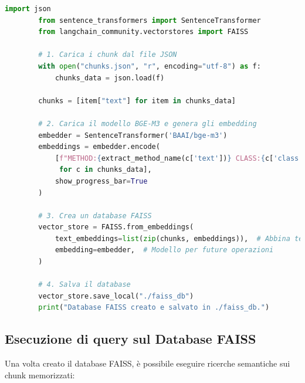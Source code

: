 \documentclass[12pt,a4paper,openright,twoside]{book}
\begin{document}
    \begin{lstlisting}[language=Python, caption={Codice Python per la generazione degli embedding e la creazione di un database FAISS}, label={lst:embeddings}]
        import json
        from sentence_transformers import SentenceTransformer
        from langchain_community.vectorstores import FAISS
        
        # 1. Carica i chunk dal file JSON
        with open("chunks.json", "r", encoding="utf-8") as f:
            chunks_data = json.load(f)
        
        chunks = [item["text"] for item in chunks_data]
        
        # 2. Carica il modello BGE-M3 e genera gli embedding
        embedder = SentenceTransformer('BAAI/bge-m3')
        embeddings = embedder.encode(
            [f"METHOD:{extract_method_name(c['text'])} CLASS:{c['class']} LINES:{c['start_line']}-{c['end_line']} CONTENT:{c['text']}" 
             for c in chunks_data],
            show_progress_bar=True
        )
        
        # 3. Crea un database FAISS
        vector_store = FAISS.from_embeddings(
            text_embeddings=list(zip(chunks, embeddings)),  # Abbina testi e embedding
            embedding=embedder,  # Modello per future operazioni
        )
        
        # 4. Salva il database
        vector_store.save_local("./faiss_db")
        print("Database FAISS creato e salvato in ./faiss_db.")
    \end{lstlisting}

\subsection{Esecuzione di query sul Database FAISS}
    Una volta creato il database FAISS, è possibile eseguire ricerche semantiche sui chunk memorizzati:
\end{document}
